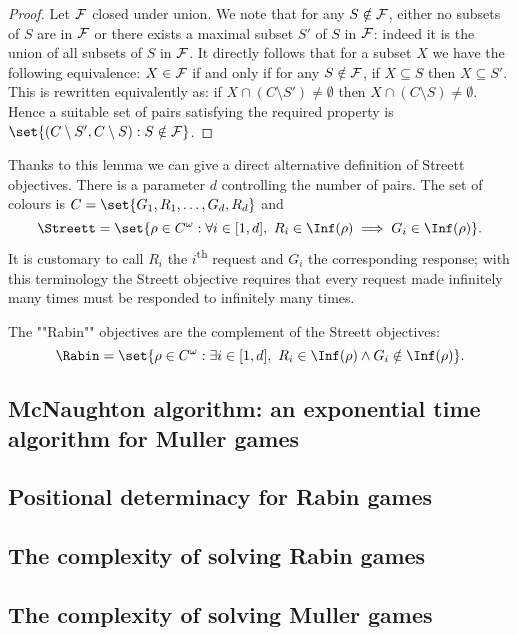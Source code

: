 \begin{proof}
Let $\mathcal{F}$ closed under union.
We note that for any $S \notin \mathcal{F}$, either no subsets of $S$ are in $\mathcal{F}$ or there exists a maximal subset $S'$ of $S$ in $\mathcal{F}$:
indeed it is the union of all subsets of $S$ in $\mathcal{F}$.
It directly follows that for a subset $X$ we have the following equivalence:
$X \in \mathcal{F}$ if and only if for any $S \notin \mathcal{F}$, if $X \subseteq S$ then $X \subseteq S'$.
This is rewritten equivalently as: if $X \cap (C \setminus S') \neq \emptyset$ then $X \cap (C \setminus S) \neq \emptyset$.
Hence a suitable set of pairs satisfying the required property is 
$\set{(C \setminus S', C \setminus S) : S \notin \F}$.
\end{proof}
Thanks to this lemma we can give a direct alternative definition of Streett objectives.
There is a parameter $d$ controlling the number of pairs.
The set of colours is $C = \set{G_1,R_1,\dots,G_d,R_d}$ and
\[
\Streett = \set{ \rho \in C^\omega : \forall i \in [1,d],\ R_i \in \Inf(\rho) \implies G_i \in \Inf(\rho) }.
\]
It is customary to call $R_i$ the $i$\textsuperscript{th} request and $G_i$ the corresponding response;
with this terminology the Streett objective requires that every request made infinitely many times must be responded to infinitely many times.

The ""Rabin"" objectives are the complement of the Streett objectives: 
\[
\Rabin = \set{ \rho \in C^\omega : \exists i \in [1,d],\ R_i \in \Inf(\rho) \wedge G_i \notin \Inf(\rho) }.
\]

\subsection*{McNaughton algorithm: an exponential time algorithm for Muller games}


\subsection*{Positional determinacy for Rabin games}


\subsection*{The complexity of solving Rabin games}


\subsection*{The complexity of solving Muller games}    

